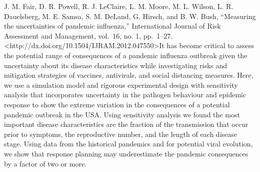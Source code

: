 \documentclass[]{article}
\begin{document}
J. M. Fair, D. R. Powell, R. J. LeClaire, L. M. Moore, M. L. Wilson, L.
R. Dauelsberg, M. E. Samsa, S. M. DeLand, G. Hirsch, and B. W. Bush,
``Measuring the uncertainties of pandemic influenza,'' International
Journal of Risk Assessment and Management, vol.~16, no. 1, pp.~1--27.
\textless{}http://dx.doi.org/10.1504/IJRAM.2012.047550\textgreater{}It
has become critical to assess the potential range of consequences of a
pandemic influenza outbreak given the uncertainty about its disease
characteristics while investigating risks and mitigation strategies of
vaccines, antivirals, and social distancing measures. Here, we use a
simulation model and rigorous experimental design with sensitivity
analysis that incorporates uncertainty in the pathogen behaviour and
epidemic response to show the extreme variation in the consequences of a
potential pandemic outbreak in the USA. Using sensitivity analysis we
found the most important disease characteristics are the fraction of the
transmission that occur prior to symptoms, the reproductive number, and
the length of each disease stage. Using data from the historical
pandemics and for potential viral evolution, we show that response
planning may underestimate the pandemic consequences by a factor of two
or more.
\end{document}

